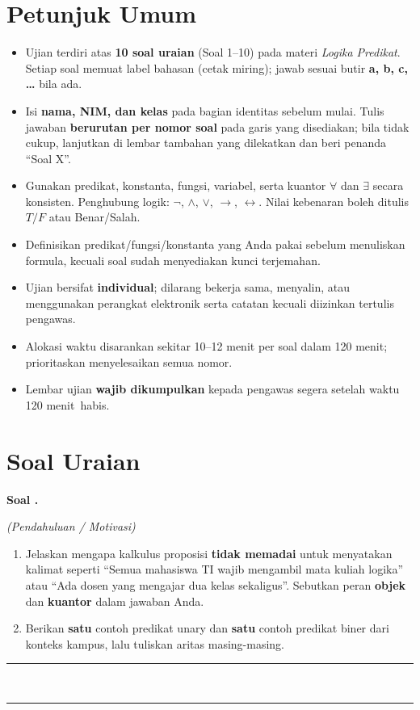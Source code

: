 \documentclass[12pt,a4paper]{article}
\newcommand{\WaktuUjian}{120 menit}
\newcounter{soaluas}
\newcommand{\soaluas}{%
  \refstepcounter{soaluas}%
  \par\vspace{0.8ex plus 0.15ex}%
  \noindent\textbf{Soal \thesoaluas.}\quad
}
\newcommand{\ruangjawaban}[1][6cm]{%
  \par\vspace{0.4em}%
  \noindent\rule{\linewidth}{0.4pt}\\[0.35em]%
  \rule{\linewidth}{0.4pt}\\[0.35em]%
  \ifdim#1>6cm\rule{\linewidth}{0.4pt}\\[0.35em]\fi
  \ifdim#1>8cm\rule{\linewidth}{0.4pt}\\[0.35em]\fi
  \par\vspace{0.7em}%
}
\begin{document}
\section*{Petunjuk Umum}
\begin{itemize}[leftmargin=*, itemsep=0.25em]
  \item Ujian terdiri atas \textbf{10 soal uraian} (Soal 1--10) pada materi \textit{Logika Predikat}.
        Setiap soal memuat label bahasan (cetak miring); jawab sesuai butir \textbf{a, b, c, \ldots} bila ada.
  \item Isi \textbf{nama, NIM, dan kelas} pada bagian identitas sebelum mulai.
        Tulis jawaban \textbf{berurutan per nomor soal} pada garis yang disediakan; bila tidak cukup, lanjutkan di lembar tambahan yang dilekatkan dan beri penanda ``Soal X''.
  \item Gunakan predikat, konstanta, fungsi, variabel, serta kuantor \(\forall\) dan \(\exists\) secara konsisten.
        Penghubung logik: \(\neg\), \(\wedge\), \(\vee\), \(\rightarrow\), \(\leftrightarrow\).
        Nilai kebenaran boleh ditulis \(T/F\) atau Benar/Salah.
  \item Definisikan predikat/fungsi/konstanta yang Anda pakai sebelum menuliskan formula, kecuali soal sudah menyediakan kunci terjemahan.
  \item Ujian bersifat \textbf{individual}; dilarang bekerja sama, menyalin, atau menggunakan perangkat elektronik serta catatan kecuali diizinkan tertulis pengawas.
  \item Alokasi waktu disarankan sekitar 10--12 menit per soal dalam \WaktuUjian; prioritaskan menyelesaikan semua nomor.
  \item Lembar ujian \textbf{wajib dikumpulkan} kepada pengawas segera setelah waktu \WaktuUjian\ habis.
\end{itemize}

\section*{Soal Uraian}

\soaluas
\textit{(Pendahuluan / Motivasi)}\\
\begin{enumerate}[label=\alph*., leftmargin=2em, itemsep=0.25em]
  \item Jelaskan mengapa kalkulus proposisi \textbf{tidak memadai} untuk menyatakan kalimat seperti
        ``Semua mahasiswa TI wajib mengambil mata kuliah logika'' atau
        ``Ada dosen yang mengajar dua kelas sekaligus''.
        Sebutkan peran \textbf{objek} dan \textbf{kuantor} dalam jawaban Anda.
  \item Berikan \textbf{satu} contoh predikat unary dan \textbf{satu} contoh predikat biner dari konteks kampus,
        lalu tuliskan aritas masing-masing.
\end{enumerate}
\ruangjawaban[8cm]
\end{document}
